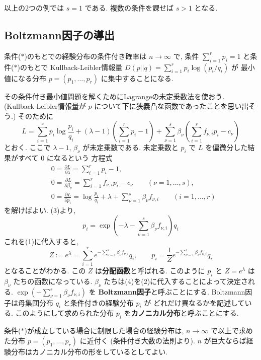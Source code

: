 \documentclass[12pt,twoside]{jarticle}
\renewcommand\d{\partial}
\theoremstyle{jplain}
\theoremstyle{jplain}
\theoremstyle{jplain}
\numberwithin{theorem}{section}
\numberwithin{equation}{section}
\numberwithin{figure}{section}
\numberwithin{table}{section}
\begin{document}
以上の2つの例では $s=1$ である.  複数の条件を課せば $s>1$ となる.


\subsection{Boltzmann因子の導出}

条件($*$)のもとでの経験分布の条件付き確率は $n\to\infty$ で, 
条件 $\sum_{i=1}^r p_i=1$ と条件($*$)のもとで
Kullback-Leibler情報量 $D(p||q)=\sum_{i=1}^r p_i\log(p_i/q_i)$ が
最小値になる分布 $p=(p_1,\ldots,p_r)$ に集中することになる.

その条件付き最小値問題を解くためにLagrangeの未定乗数法を使おう.
(Kullback-Leibler情報量が $p$ について下に狭義凸な函数であったことを思い出そう.)
そのために
\[
L 
= \sum_{i=1}^r p_i \log\frac{p_i}{q_i} 
+ (\lambda-1)\left(\sum_{i=1}^r p_i-1\right)
+ \sum_{\nu=1}^s\beta_\nu\left(\sum_{i=1}^r f_{\nu,i}p_i - c_\nu \right)
\]
とおく. ここで $\lambda-1$, $\beta_\nu$ が未定乗数である.
未定乗数と $p_i$ で $L$ を偏微分した結果がすべて $0$ になるという
方程式
\begin{align*}
&
0=\frac{\d L}{\d\lambda} = \sum_{i=1}^r p_i - 1,
\tag{1}
\\ &
0=\frac{\d L}{\d\beta_\nu} = \sum_{i=1}^r f_{\nu,i}p_i - c_\nu
\qquad (\nu=1,\ldots,s),
\tag{2}
\\ &
0=\frac{\d L}{\d p_i} = \log\frac{p_i}{q_i} + \lambda + \sum_{\nu=1}^s \beta_\nu f_{\nu,i}
\qquad (i=1,\ldots,r)
\tag{3} 
\end{align*}
を解けばよい. (3)より,
\[
p_i = \exp\left(-\lambda-\sum_{\nu=1}^s \beta_\nu f_{\nu,i} \right)q_i
\]
これを(1)に代入すると,
\[
Z:= e^\lambda 
= \sum_{i=1}^r e^{-\sum_{\nu=1}^s \beta_\nu f_{\nu,i}}q_i,
\qquad
p_i = \frac{1}{Z}e^{-\sum_{\nu=1}^s \beta_\nu f_{\nu,i}}q_i
\tag{4}
\]
となることがわかる. この $Z$ は{\bf 分配函数}と呼ばれる.
このように $p_i$ と $Z=e^\lambda$ は $\beta_\nu$ たちの函数になっている. 
$\beta_\nu$ たちは(4)を(2)に代入することによって決定される.
$\exp\left(-\sum_{\nu=1}^s \beta_\nu f_{\nu,i}\right)$ を
{\bf Boltzmann因子}と呼ぶことにする.
Boltzmann因子は母集団分布 $q_i$ と条件付きの経験分布 $p_i$ が
どれだけ異なるかを記述している.
このようにして求められた分布 $p_i$ を{\bf カノニカル分布}と呼ぶことにする.

条件($*$)が成立している場合に制限した場合の経験分布は,
$n\to\infty$ で以上で求めた分布 $p=(p_1,\ldots,p_r)$ に近付く
(条件付き大数の法則より). 
$n$ が巨大ならば経験分布はカノニカル分布の形をしているとしてよい.
\end{document}
